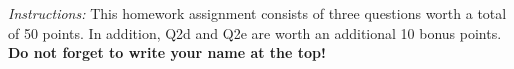 


\oddsidemargin 0in
\evensidemargin 0in
\textwidth 6.5in
\topmargin -0.5in
\textheight 9.0in

\usepackage{hyperref}
\usepackage{float}
\usepackage{pdfpages}
\usepackage{textcomp}
\usepackage{mathtools}
\usepackage{algorithm}
\usepackage{array}
\usepackage{tabu}
\usepackage{changepage}
\usepackage{amsmath}
\usepackage{amssymb}
\usepackage[noend]{algpseudocode}
\usepackage{graphicx,url,epstopdf}
\usepackage{xcolor}
\usepackage{forest}
\makeatletter
\def\BState{\State\hskip-\ALG@thistlm}
\makeatother
\sloppy
\usepackage{colortbl}


\newcommand\tab[1][1cm]{\hspace*{#1}}





\pagestyle{myheadings}  %

\noindent\emph{Instructions:} This homework assignment consists of three questions worth a total of 50 points. 
In addition, Q2d and Q2e are worth an additional 10 bonus points.
\textbf{Do not forget to write your name at the top!}


